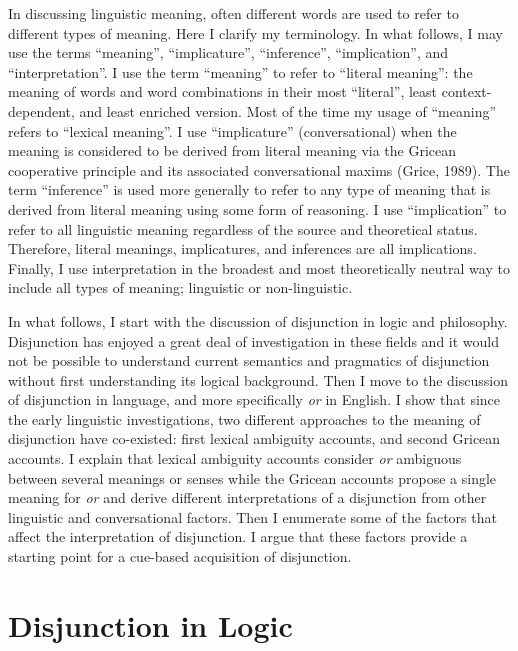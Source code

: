 \documentclass[oneside]{report}
\theoremstyle{definition}
\theoremstyle{definition}
\theoremstyle{definition}
\theoremstyle{remark}
\begin{document}
In discussing linguistic meaning, often different words are used to
refer to different types of meaning. Here I clarify my terminology. In
what follows, I may use the terms ``meaning'', ``implicature'',
``inference'', ``implication'', and ``interpretation''. I use the term
``meaning'' to refer to ``literal meaning'': the meaning of words and
word combinations in their most ``literal'', least context-dependent,
and least enriched version. Most of the time my usage of ``meaning''
refers to ``lexical meaning''. I use ``implicature'' (conversational)
when the meaning is considered to be derived from literal meaning via
the Gricean cooperative principle and its associated conversational
maxims (Grice, 1989). The term ``inference'' is used more generally to
refer to any type of meaning that is derived from literal meaning using
some form of reasoning. I use ``implication'' to refer to all linguistic
meaning regardless of the source and theoretical status. Therefore,
literal meanings, implicatures, and inferences are all implications.
Finally, I use interpretation in the broadest and most theoretically
neutral way to include all types of meaning; linguistic or
non-linguistic.

In what follows, I start with the discussion of disjunction in logic and
philosophy. Disjunction has enjoyed a great deal of investigation in
these fields and it would not be possible to understand current
semantics and pragmatics of disjunction without first understanding its
logical background. Then I move to the discussion of disjunction in
language, and more specifically \emph{or} in English. I show that since
the early linguistic investigations, two different approaches to the
meaning of disjunction have co-existed: first lexical ambiguity
accounts, and second Gricean accounts. I explain that lexical ambiguity
accounts consider \emph{or} ambiguous between several meanings or senses
while the Gricean accounts propose a single meaning for \emph{or} and
derive different interpretations of a disjunction from other linguistic
and conversational factors. Then I enumerate some of the factors that
affect the interpretation of disjunction. I argue that these factors
provide a starting point for a cue-based acquisition of disjunction.

\section{Disjunction in Logic}\label{logic}
\end{document}
